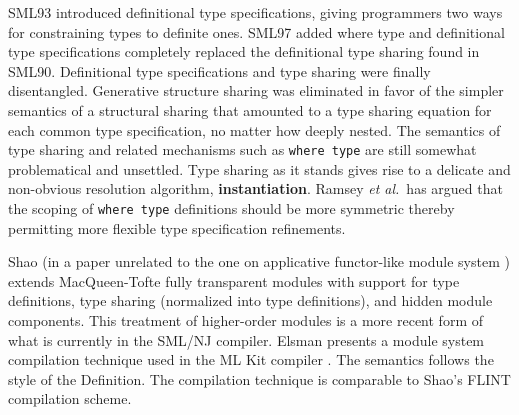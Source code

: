 \documentclass[12pt]{article}
\newcommand{\etal}{{\it et al.}}
\begin{document}
SML93 introduced definitional type specifications, giving programmers two ways for constraining types to definite ones. SML97 added where type and definitional type specifications completely replaced the definitional type sharing found in SML90. Definitional type specifications and type sharing were finally disentangled. Generative structure sharing was eliminated in favor of the simpler semantics of a structural sharing that amounted to a type sharing equation for each common type specification, no matter how deeply nested. The semantics of type sharing and related mechanisms such as \lstinline{where type} are still somewhat problematical and unsettled\cite{narbel:jfp07,ramsey05}. Type sharing as it stands gives rise to a delicate and non-obvious resolution algorithm, {\bf instantiation}. Ramsey \etal~has argued that the scoping of \lstinline{where type} definitions should be more symmetric thereby permitting more flexible type specification refinements.

% 


Shao \cite{shao98} (in a paper unrelated to the one on applicative functor-like module system \cite{shao99}) extends MacQueen-Tofte fully transparent modules with support for type definitions, type sharing (normalized into type definitions), and hidden module components. This treatment of higher-order modules is a more recent form of what is currently in the SML/NJ compiler. Elsman presents a module system compilation technique used in the ML Kit compiler \cite{elsman99}. The semantics follows the style of the Definition. The compilation technique is comparable to Shao's FLINT compilation scheme. 
\end{document}
